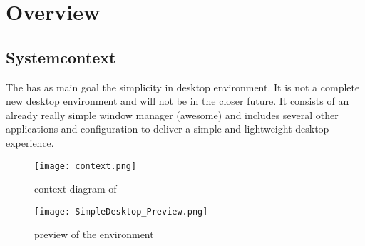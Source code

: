 	\section{Overview}
	    \subsection{Systemcontext}
		The \project has as main goal the simplicity in desktop environment. It is not a complete new desktop environment and will not be in the closer future. It consists of an already really simple window manager (awesome) and includes several other applications and configuration to deliver a simple and lightweight desktop experience.
		
		\begin{figure}[H]
			\centering
			\texttt{[image: context.png]}
			\label{context}
			\caption{context diagram of \project}
		\end{figure}
		
		\begin{figure}[H]
			\centering
			\texttt{[image: SimpleDesktop\_Preview.png]}
			\label{preview}
			\caption{preview of the \project environment}
		\end{figure}